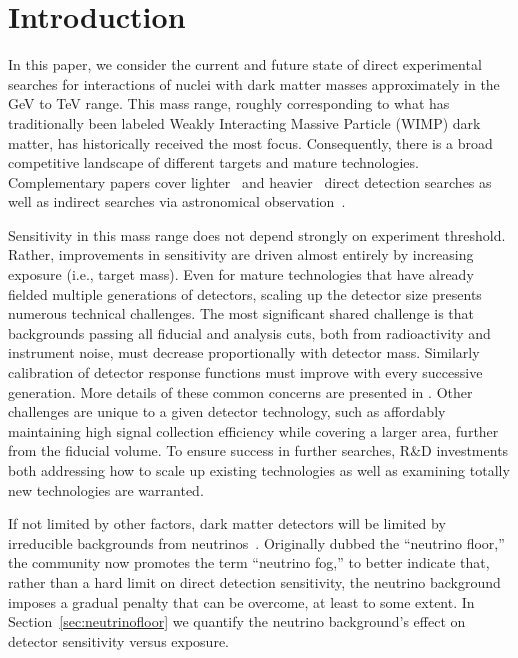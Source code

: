 \section{Introduction}
\label{sec:intro}
In this paper, we consider the current and future state of direct experimental searches for interactions of nuclei with dark matter masses approximately in the GeV to TeV range. This mass range, roughly corresponding to what has traditionally been labeled Weakly Interacting Massive Particle (WIMP) dark matter,  has historically received the most focus. Consequently, there is a broad competitive landscape of different targets and mature technologies. 
Complementary papers cover lighter~\cite{SnowmassCF1WP2} and heavier~\cite{SnowmassCF1WP8} direct detection searches as well as indirect searches via astronomical observation~\cite{SnowmassCF1WP5}. 

Sensitivity in this mass range does not depend strongly on experiment threshold. Rather, improvements in sensitivity are driven almost entirely by increasing exposure (i.e., target mass). Even for mature technologies that have already fielded multiple generations of detectors, scaling up the detector size presents numerous technical challenges. The most significant shared challenge is that backgrounds passing all fiducial and analysis cuts, both from radioactivity and instrument noise, must decrease proportionally with detector mass. Similarly calibration of detector response functions must improve with every successive generation. More details of these common concerns are presented in \cite{SnowmassCF1WP3}. Other challenges are unique to a given detector technology, such as affordably maintaining high signal collection efficiency while covering a larger area, further from the fiducial volume. To ensure success in further searches, R\&D investments both addressing how to scale up existing technologies as well as examining totally new technologies are warranted. 

If not limited by other factors, dark matter detectors will be limited by irreducible backgrounds from neutrinos~\cite{monroe2007, strigari2009, billard2014b}. Originally dubbed the ``neutrino floor,''  the community now promotes the term ``neutrino fog,'' to better indicate that, rather than a hard limit on direct detection sensitivity, the neutrino background imposes a gradual penalty that can be overcome, at least to some extent. In Section~\ref{sec:neutrinofloor} we quantify the neutrino background's effect on detector sensitivity versus exposure. 

